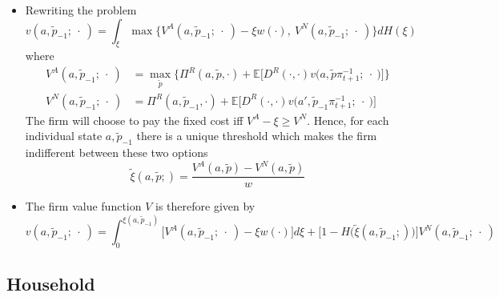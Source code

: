 \documentclass[a4paper,10pt]{article}  %
\begin{document}
\begin{itemize}
   \item Rewriting the problem
   \[
      v(a, \tilde{p}_{-1}; \ \cdot \ ) = \int_{\xi} \max \Big\{ V^A(a,\tilde{p}_{-1}; \ \cdot \ ) - \xi w(\cdot) , \ V^N(a,\tilde{p}_{-1} ; \ \cdot \ )  \Big\} dH(\xi )
   \]
   where
   \begin{equation}
      \label{eq:model_eq4}
      \begin{split}
      V^A(a, \tilde{p}_{-1}; \ \cdot \ ) & = \max_{\tilde{p}} 
         \Bigg\{ 
            \Pi^R \left( a, \tilde{p}, \cdot \right) + 
            \mathbb{E} \bigg[ D^R(\cdot,\cdot) v\Big( a,\tilde{p} \pi_{t+1}^{-1} ; \ \cdot \ \Big) \bigg]
         \Bigg\} \\
      V^N(a, \tilde{p}_{-1}; \ \cdot \ ) & = 
          \Pi^R \left( a, \tilde{p}_{-1}, \cdot \right) + \mathbb{E}
          \Big[ 
               D^R(\cdot,\cdot) v\Big( a', \tilde{p}_{-1}\pi_{t+1}^{-1} ; \ \cdot \  \Big)
          \Big]
      \end{split}
   \end{equation}
   The firm will choose to pay the fixed cost iff $ V^A -\xi \ge V^N $. Hence, for 
   each individual state $ a, \tilde{p}_{-1} $ there is a unique threshold which makes the firm 
   indifferent between these two options
   \[
      \tilde{\xi}(a, \tilde{p} ; ) = \frac{V^A(a, \tilde{p} ) - V^N( a, \tilde{p})}{w}
   \]

   \item The firm value function $V$ is therefore given by
   \begin{equation}
      v(a, \tilde{p}_{-1}; \ \cdot \ ) = 
         \int_0^{ \xi(a,\tilde{p}_{-1} ) } 
         \Big[ 
            V^A(a, \tilde{p}_{-1} ; \ \cdot \ ) - \xi w(\cdot) 
         \Big]d\xi  
         + \Big[  1 - H\Big( \tilde{\xi}(a, \tilde{p}_{-1} ; ) \Big) \Big] V^N(a,\tilde{p}_{-1} ; \ \cdot \ )
   \end{equation}
\end{itemize}

\subsection{Household} %
\label{sub:household}



\end{document}
